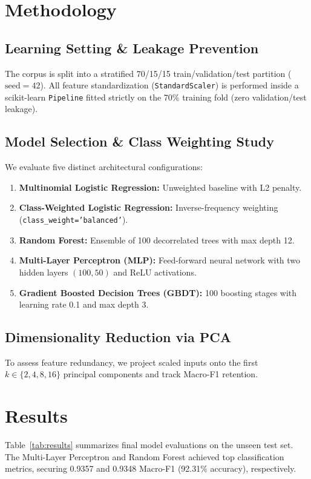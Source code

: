 \documentclass[conference]{IEEEtran}
\begin{document}
\section{Methodology}
\subsection{Learning Setting & Leakage Prevention}
The corpus is split into a stratified 70/15/15 train/validation/test partition ($\text{seed}=42$). All feature standardization (\texttt{StandardScaler}) is performed inside a scikit-learn \texttt{Pipeline} fitted strictly on the 70\% training fold (zero validation/test leakage).

\subsection{Model Selection & Class Weighting Study}
We evaluate five distinct architectural configurations:
\begin{enumerate}
\item \textbf{Multinomial Logistic Regression:} Unweighted baseline with L2 penalty.
\item \textbf{Class-Weighted Logistic Regression:} Inverse-frequency weighting (\texttt{class\_weight='balanced'}).
\item \textbf{Random Forest:} Ensemble of 100 decorrelated trees with max depth 12.
\item \textbf{Multi-Layer Perceptron (MLP):} Feed-forward neural network with two hidden layers $(100, 50)$ and ReLU activations.
\item \textbf{Gradient Boosted Decision Trees (GBDT):} 100 boosting stages with learning rate 0.1 and max depth 3.
\end{enumerate}

\subsection{Dimensionality Reduction via PCA}
To assess feature redundancy, we project scaled inputs onto the first $k \in \{2, 4, 8, 16\}$ principal components and track Macro-F1 retention.

\section{Results}
Table~\ref{tab:results} summarizes final model evaluations on the unseen test set. The Multi-Layer Perceptron and Random Forest achieved top classification metrics, securing 0.9357 and 0.9348 Macro-F1 (92.31\% accuracy), respectively.
\end{document}
